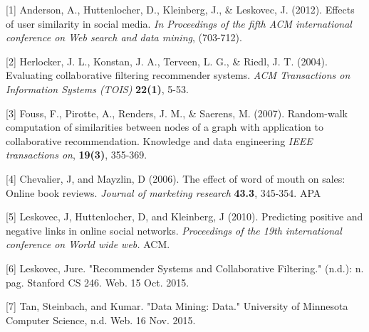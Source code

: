 \documentclass[10pt]{article}
\begin{document}
\begin{thebibliography}{}

[1] Anderson, A., Huttenlocher, D., Kleinberg, J., \& Leskovec, J. (2012). Effects of user similarity in social media. \textit{In Proceedings of the fifth ACM international conference on Web search and data mining}, (703-712).

[2] Herlocker, J. L., Konstan, J. A., Terveen, L. G., \& Riedl, J. T. (2004).
\newblock Evaluating collaborative filtering recommender systems.
\newblock \emph{ACM Transactions on Information Systems (TOIS)} \textbf{22(1)}, 5-53.

[3] Fouss, F., Pirotte, A., Renders, J. M., \& Saerens, M. (2007).
\newblock Random-walk computation of similarities between nodes of a graph with application to collaborative recommendation. Knowledge and data engineering
\newblock \emph{IEEE transactions on}, \textbf{19(3)}, 355-369.

[4] Chevalier, J, and Mayzlin, D (2006). The effect of word of mouth on sales: Online book reviews. \emph{Journal of marketing research} \textbf{43.3}, 345-354.
APA 

[5] Leskovec, J, Huttenlocher, D, and Kleinberg, J (2010). Predicting positive and negative links in online social networks. \emph{Proceedings of the 19th international conference on World wide web.} ACM.

[6] Leskovec, Jure. "Recommender Systems and Collaborative Filtering." (n.d.): n. pag. Stanford CS 246. Web. 15 Oct. 2015.

[7] Tan, Steinbach, and Kumar. "Data Mining: Data." University of Minnesota Computer Science, n.d. Web. 16 Nov. 2015.


\end{thebibliography}{}
\end{document}
